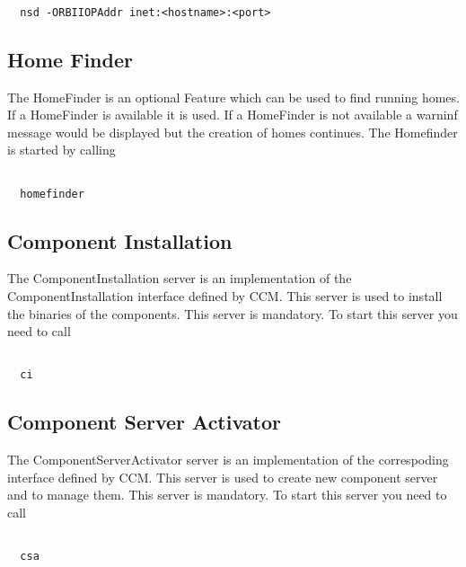 \documentclass[12pt,a4paper]{report}
\begin{document}
\small
\begin{verbatim}

  nsd -ORBIIOPAddr inet:<hostname>:<port>

\end{verbatim}
\normalsize

\subsection{Home Finder}
\label{sec:HomeFinder}

The HomeFinder is an optional Feature which can be used to find running homes. If a HomeFinder is available it is used. If a HomeFinder is not available a warninf message would be displayed but the creation of homes continues. The Homefinder is started by calling

\small
\begin{verbatim}

  homefinder

\end{verbatim}
\normalsize

\subsection{Component Installation}
\label{sec:ComponentInstallation}
The ComponentInstallation server is an implementation of the ComponentInstallation interface defined by CCM. This server is used to install the binaries of the components. This server is mandatory. To start this server you need to call

\small
\begin{verbatim}

  ci

\end{verbatim}
\normalsize

\subsection{Component Server Activator}
\label{sec:ComponentServerActivator}

The ComponentServerActivator server is an implementation of the correspoding interface defined by CCM. This server is used to create new component server and to manage them. This server is mandatory. To start this server you need to call 

\small
\begin{verbatim}

  csa

\end{verbatim}
\normalsize
\end{document}
